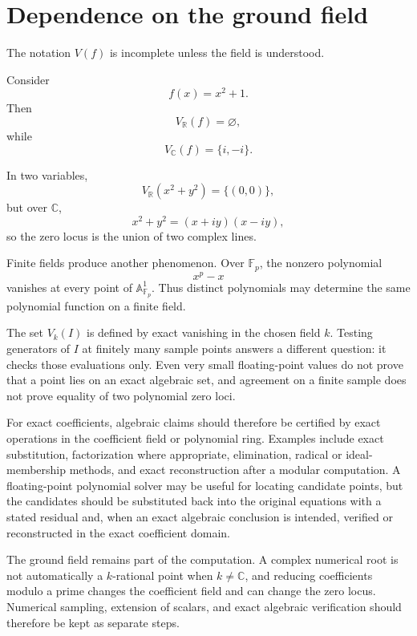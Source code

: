 \section{Dependence on the ground field}
\label{sec:vi01-field-dependence}

The notation \(V(f)\) is incomplete unless the field is understood.

\begin{example}
Consider
\[
  f(x)=x^2+1.
\]
Then
\[
  V_{\mathbb R}(f)=\varnothing,
\]
while
\[
  V_{\mathbb C}(f)=\{i,-i\}.
\]
\end{example}

\begin{example}
In two variables,
\[
  V_{\mathbb R}(x^2+y^2)=\{(0,0)\},
\]
but over \(\mathbb C\),
\[
  x^2+y^2=(x+iy)(x-iy),
\]
so the zero locus is the union of two complex lines.
\end{example}

Finite fields produce another phenomenon.  Over \(\mathbb F_p\), the nonzero polynomial
\[
  x^p-x
\]
vanishes at every point of \(\mathbb A_{\mathbb F_p}^1\).  Thus distinct polynomials may
determine the same polynomial function on a finite field.

\begin{remark}
The set \(V_k(I)\) is defined by exact vanishing in the chosen field \(k\).
Testing generators of \(I\) at finitely many sample points answers a different
question: it checks those evaluations only. Even very small floating-point
values do not prove that a point lies on an exact algebraic set, and agreement
on a finite sample does not prove equality of two polynomial zero loci.

For exact coefficients, algebraic claims should therefore be certified by
exact operations in the coefficient field or polynomial ring. Examples include
exact substitution, factorization where appropriate, elimination, radical or
ideal-membership methods, and exact reconstruction after a modular computation.
A floating-point polynomial solver may be useful for locating candidate points,
but the candidates should be substituted back into the original equations with
a stated residual and, when an exact algebraic conclusion is intended, verified
or reconstructed in the exact coefficient domain.

The ground field remains part of the computation. A complex numerical root is
not automatically a \(k\)-rational point when \(k\neq\mathbb C\), and reducing
coefficients modulo a prime changes the coefficient field and can change the
zero locus. Numerical sampling, extension of scalars, and exact algebraic
verification should therefore be kept as separate steps.
\end{remark}

